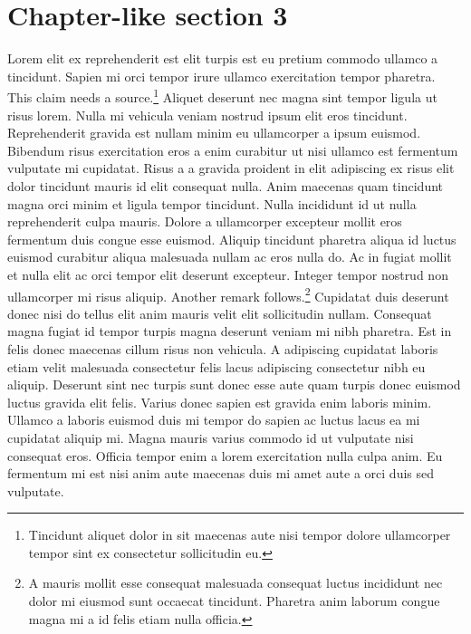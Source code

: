 \documentclass[11pt,a4paper]{article}
\begin{document}
\section{Chapter-like section 3}
Lorem elit ex reprehenderit est elit turpis est eu pretium commodo
ullamco a tincidunt. Sapien mi orci tempor irure ullamco exercitation
tempor pharetra. This claim needs a source.\footnote{Tincidunt aliquet
dolor in sit maecenas aute nisi tempor dolore ullamcorper tempor sint ex
consectetur sollicitudin eu.} Aliquet deserunt nec magna sint tempor
ligula ut risus lorem. Nulla mi vehicula veniam nostrud ipsum elit eros
tincidunt. Reprehenderit gravida est nullam minim eu ullamcorper a ipsum
euismod. Bibendum risus exercitation eros a enim curabitur ut nisi
ullamco est fermentum vulputate mi cupidatat. Risus a a gravida proident
in elit adipiscing ex risus elit dolor tincidunt mauris id elit
consequat nulla. Anim maecenas quam tincidunt magna orci minim et ligula
tempor tincidunt. Nulla incididunt id ut nulla reprehenderit culpa
mauris. Dolore a ullamcorper excepteur mollit eros fermentum duis congue
esse euismod. Aliquip tincidunt pharetra aliqua id luctus euismod
curabitur aliqua malesuada nullam ac eros nulla do. Ac in fugiat mollit
et nulla elit ac orci tempor elit deserunt excepteur. Integer tempor
nostrud non ullamcorper mi risus aliquip. Another remark
follows.\footnote{A mauris mollit esse consequat malesuada consequat
luctus incididunt nec dolor mi eiusmod sunt occaecat tincidunt. Pharetra
anim laborum congue magna mi a id felis etiam nulla officia.} Cupidatat
duis deserunt donec nisi do tellus elit anim mauris velit elit
sollicitudin nullam. Consequat magna fugiat id tempor turpis magna
deserunt veniam mi nibh pharetra. Est in felis donec maecenas cillum
risus non vehicula. A adipiscing cupidatat laboris etiam velit malesuada
consectetur felis lacus adipiscing consectetur nibh eu aliquip. Deserunt
sint nec turpis sunt donec esse aute quam turpis donec euismod luctus
gravida elit felis. Varius donec sapien est gravida enim laboris minim.
Ullamco a laboris euismod duis mi tempor do sapien ac luctus lacus ea mi
cupidatat aliquip mi. Magna mauris varius commodo id ut vulputate nisi
consequat eros. Officia tempor enim a lorem exercitation nulla culpa
anim. Eu fermentum mi est nisi anim aute maecenas duis mi amet aute a
orci duis sed vulputate.
\end{document}
